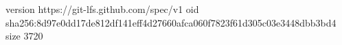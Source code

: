 version https://git-lfs.github.com/spec/v1
oid sha256:8d97e0dd17de812df141eff4d27660afca060f7823f61d305c03e3448dbb3bd4
size 3720
